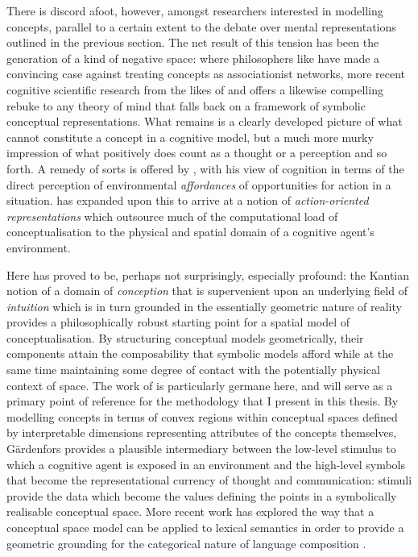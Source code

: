 There is discord afoot, however, amongst researchers interested in modelling concepts, parallel to a certain extent to the debate over mental representations outlined in the previous section.  The net result of this tension has been the generation of a kind of negative space: where philosophers like \cite{FodorEA1988} have made a convincing case against treating concepts as associationist networks, more recent cognitive scientific research from the likes of \cite{Hutto2001} and \cite{Chemero2009} offers a likewise compelling rebuke to any theory of mind that falls back on a framework of symbolic conceptual representations.  What remains is a clearly developed picture of what cannot constitute a concept in a cognitive model, but a much more murky impression of what positively does count as a thought or a perception and so forth.  A remedy of sorts is offered by \cite{Gibson1979}, with his view of cognition in terms of the direct perception of environmental \emph{affordances} of opportunities for action in a situation.  \cite{Clark1997} has expanded upon this to arrive at a notion of \emph{action-oriented representations} which outsource much of the computational load of conceptualisation to the physical and spatial domain of a cognitive agent's environment.

Here \cite{Kant1787} has proved to be, perhaps not surprisingly, especially profound: the Kantian notion of a domain of \emph{conception} that is supervenient upon an underlying field of \emph{intuition} which is in turn grounded in the essentially geometric nature of reality provides a philosophically robust starting point for a spatial model of conceptualisation.  By structuring conceptual models geometrically, their components attain the composability that symbolic models afford while at the same time maintaining some degree of contact with the potentially physical context of space.  The work of \cite{Gardenfors2000} is particularly germane here, and will serve as a primary point of reference for the methodology that I present in this thesis.  By modelling concepts in terms of convex regions within conceptual spaces defined by interpretable dimensions representing attributes of the concepts themselves, G\"{a}rdenfors provides a plausible intermediary between the low-level stimulus to which a cognitive agent is exposed in an environment and the high-level symbols that become the representational currency of thought and communication: stimuli provide the data which become the values defining the points in a symbolically realisable conceptual space.  More recent work has explored the way that a conceptual space model can be applied to lexical semantics in order to provide a geometric grounding for the categorical nature of language composition \citep{Gardenfors2014}.


